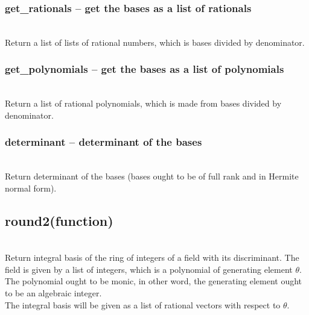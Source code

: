   \subsubsection{get\_rationals -- get the bases as a list of rationals}
   \\
   \spacing
   \quad Return a list of lists of rational numbers, which is bases
   divided by denominator.\\
   \spacing
 \subsubsection{get\_polynomials -- get the bases as a list of polynomials}
   \\
   \spacing
   \quad Return a list of rational polynomials, which is made from
   bases divided by denominator.\\

   \subsubsection{determinant -- determinant of the bases}
   \\
   \spacing
   \quad Return determinant of the bases (bases ought to be of full
   rank and in Hermite normal form).

\C
  \subsection{round2(function)}
  \\
   \spacing
   \quad Return integral basis of the ring of integers of a field with its
    discriminant.  The field is given by a list of integers, which is
    a polynomial of generating element \(\theta\).  The polynomial ought to
    be monic, in other word, the generating element ought to be an
    algebraic integer.\\
    \quad The integral basis will be given as a list of rational vectors
    with respect to \(\theta\).\\
   \spacing
